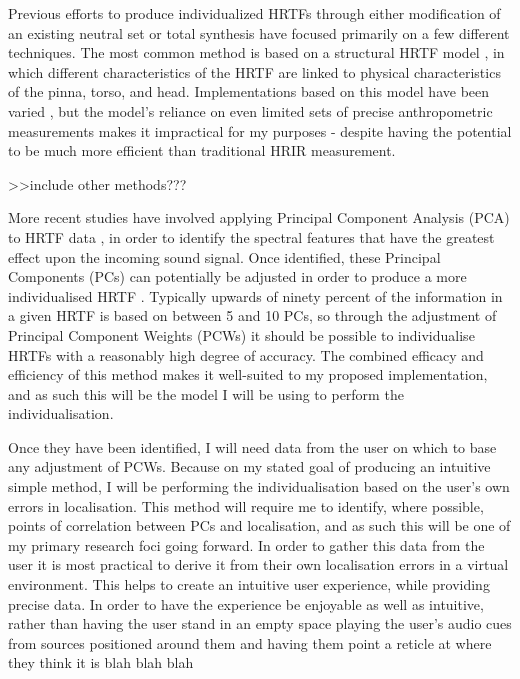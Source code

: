 \documentclass[10pt, oneside, a4paper, draft]{scrartcl}
\begin{document}
Previous efforts to produce individualized HRTFs through either modification of an existing neutral set or total synthesis have focused primarily on a few different techniques. The most common method is based on a structural HRTF model \cite{PhillipBrown1998, Raykar2003}, in which different characteristics of the HRTF are linked to physical characteristics of the pinna, torso, and head. Implementations based on this model have been varied \cite{Tashev2014, Xu2007, DmitryN.ZotkinJaneHwangRamaniDuraiswami2003}, but the model's reliance on even limited sets of precise anthropometric measurements makes it impractical for my purposes - despite having the potential to be much more efficient than traditional HRIR measurement. 

>>include other methods???

More recent studies have involved applying Principal Component Analysis (PCA) to HRTF data \cite{Holzl2012a}, in order to identify the spectral features that have the greatest effect upon the incoming sound signal. Once identified, these Principal Components (PCs) can potentially be adjusted in order to produce a more individualised HRTF \cite{Fink2012,Holzl2014a}. Typically upwards of ninety percent of the information in a given HRTF is based on between 5 and 10 PCs, so through the adjustment of Principal Component Weights (PCWs) it should be possible to individualise HRTFs with a reasonably high degree of accuracy. The combined efficacy and efficiency of this method makes it well-suited to my proposed implementation, and as such this will be the model I will be using to perform the individualisation. 

Once they have been identified, I will need data from the user on which to base any adjustment of PCWs. Because on my stated goal of producing an intuitive simple method, I will be performing the individualisation based on the user's own errors in localisation. This method will require me to identify, where possible, points of correlation between PCs and localisation, and as such this will be one of my primary research foci going forward. In order to gather this data from the user it is most practical to derive it from their own localisation errors in a virtual environment. This helps to create an intuitive user experience, while providing precise data. In order to have the experience be enjoyable as well as intuitive, rather than having the user stand in an empty space playing the user's audio cues from sources positioned around them and having them point a reticle at where they think it is blah blah blah
\end{document}

